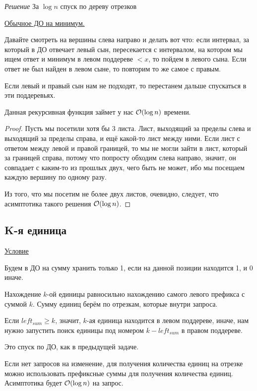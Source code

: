 {\it Решение } За $\log n$ спуск по дереву отрезков

\href{https://codeforces.com/blog/entry/70625}{Обычное ДО на минимум.}

Давайте смотреть на вершины слева направо и делать вот что: если интервал, за который в ДО отвечает левый сын, пересекается с интервалом, на котором мы ищем ответ и минимум в левом поддереве $<x$, то пойдем в левого сына. Если ответ не был найден в левом сыне, то повторим то же самое с правым.

Если левый и правый сын нам не подходят, то перестанем дальше спускаться в эти поддеревьях.

\begin{Thm}\label{thm@splay}
	Данная рекурсивная функция займет у нас $\mathcal{O}(\log n)$ времени.
\end{Thm}

\begin{proof}
	Пусть мы посетили хотя бы 3 листа. Лист, выходящий за пределы слева и выходящий за пределы справа, и ещё какой-то лист между ними. Если лист с ответом между левой и правой границей, то мы не могли зайти в лист, который за границей справа, потому что попросту обходим слева направо, значит, он совпадает с каким-то из прошлых двух, чего быть не может, ибо мы посещаем каждую вершину по одному разу.
	
	Из того, что мы посетим не более двух листов, очевидно, следует, что асимптотика такого решения $\mathcal{O}(\log n)$.
\end{proof}


\subsection{K-я единица} \href{https://codeforces.com/edu/course/2/lesson/4/2/practice/contest/273278/problem/B}{Условие}

Будем в ДО на сумму хранить только 1, если на данной позиции находится 1, и 0 иначе.
\down

Нахождение $k$-ой единицы равносильно нахождению самого левого префикса с суммой $k$. Сумму единиц берём по отрезкам, которые внутри запроса.

Если $left_{sum} \ge k$, значит, $k$-ая единица находится в левом поддереве, иначе, нам нужно запустить поиск единицы под номером $k - left_{sum}$ в правом поддереве.

Это спуск по ДО, как в предыдущей задаче.

\down

Если нет запросов на изменение, для получения количества единиц на отрезке можно использовать префиксные суммы для получения количества единиц. 
Асимптотика будет $ \mathcal{O}(\log n)$ на запрос.

